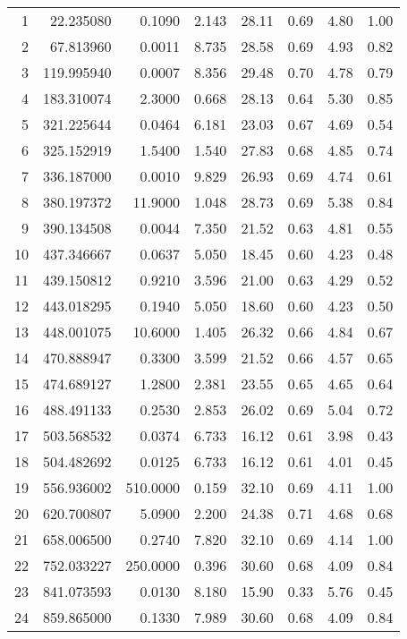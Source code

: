 {\begin{longtable}{rrrrrrrr}
1    &    22.235080&    0.1090&  2.143&   28.11&   0.69&  4.80&  1.00\\
2    &    67.813960&    0.0011&  8.735&   28.58&   0.69&  4.93&  0.82\\
3    &   119.995940&    0.0007&  8.356&   29.48&   0.70&  4.78&  0.79\\
4    &   183.310074&    2.3000&  0.668&   28.13&   0.64&  5.30&  0.85\\
5    &   321.225644&    0.0464&  6.181&   23.03&   0.67&  4.69&  0.54\\
6    &   325.152919&    1.5400&  1.540&   27.83&   0.68&  4.85&  0.74\\
7    &   336.187000&    0.0010&  9.829&   26.93&   0.69&  4.74&  0.61\\
8    &   380.197372&   11.9000&  1.048&   28.73&   0.69&  5.38&  0.84\\
9    &   390.134508&    0.0044&  7.350&   21.52&   0.63&  4.81&  0.55\\
10    &   437.346667&    0.0637&  5.050&   18.45&   0.60&  4.23&  0.48\\
11    &   439.150812&    0.9210&  3.596&   21.00&   0.63&  4.29&  0.52\\
12    &   443.018295&    0.1940&  5.050&   18.60&   0.60&  4.23&  0.50\\
13    &   448.001075&   10.6000&  1.405&   26.32&   0.66&  4.84&  0.67\\
14    &   470.888947&    0.3300&  3.599&   21.52&   0.66&  4.57&  0.65\\
15    &   474.689127&    1.2800&  2.381&   23.55&   0.65&  4.65&  0.64\\
16    &   488.491133&    0.2530&  2.853&   26.02&   0.69&  5.04&  0.72\\
17    &   503.568532&    0.0374&  6.733&   16.12&   0.61&  3.98&  0.43\\
18    &   504.482692&    0.0125&  6.733&   16.12&   0.61&  4.01&  0.45\\
19    &   556.936002&  510.0000&  0.159&   32.10&   0.69&  4.11&  1.00\\
20    &   620.700807&    5.0900&  2.200&   24.38&   0.71&  4.68&  0.68\\
21    &   658.006500&    0.2740&  7.820&   32.10&   0.69&  4.14&  1.00\\
22    &   752.033227&  250.0000&  0.396&   30.60&   0.68&  4.09&  0.84\\
23    &   841.073593&    0.0130&  8.180&   15.90&   0.33&  5.76&  0.45\\
24    &   859.865000&    0.1330&  7.989&   30.60&   0.68&  4.09&  0.84\\

\end{longtable}}
